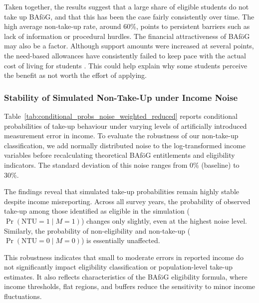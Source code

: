 Taken together, the results suggest that a large share of eligible students do not take up BAföG, and that this has been the case fairly consistently over time. The high average non-take-up rate, around 60\%, points to persistent barriers such as lack of information or procedural hurdles. The financial attractiveness of BAföG may also be a factor. Although support amounts were increased at several points, the need-based allowances have consistently failed to keep pace with the actual cost of living for students \citep{staack_von_2017}. This could help explain why some students perceive the benefit as not worth the effort of applying. 


\subsubsection{Stability of Simulated Non-Take-Up under Income Noise}
Table~\ref{tab:conditional_probs_noise_weighted_reduced} reports conditional probabilities of take-up behaviour under varying levels of artificially introduced measurement error in income. 
To evaluate the robustness of our non-take-up classification, we add normally distributed noise to the log-transformed income variables before recalculating theoretical BAföG entitlements and eligibility indicators. 
The standard deviation of this noise ranges from 0\% (baseline) to 30\%.



The findings reveal that simulated take-up probabilities remain highly stable despite income misreporting. 
Across all survey years, the probability of observed take-up among those identified as eligible in the simulation (\( \Pr(\mathrm{NTU}=1 \mid M=1) \)) changes only slightly, even at the highest noise level. 
Similarly, the probability of non-eligibility and non-take-up (\( \Pr(\mathrm{NTU}=0 \mid M=0) \)) is essentially unaffected.

This robustness indicates that small to moderate errors in reported income do not significantly impact eligibility classification or population-level take-up estimates. 
It also reflects characteristics of the BAföG eligibility formula, where income thresholds, flat regions, and buffers reduce the sensitivity to minor income fluctuations.

